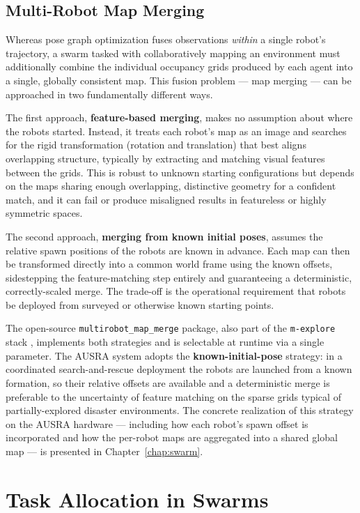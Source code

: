 \subsection{Multi-Robot Map Merging}
\label{subsec:map_merging}
Whereas pose graph optimization fuses observations \emph{within} a single robot's trajectory, a swarm tasked with collaboratively mapping an environment must additionally combine the individual occupancy grids produced by each agent into a single, globally consistent map. This fusion problem --- map merging --- can be approached in two fundamentally different ways.

The first approach, \textbf{feature-based merging}, makes no assumption about where the robots started. Instead, it treats each robot's map as an image and searches for the rigid transformation (rotation and translation) that best aligns overlapping structure, typically by extracting and matching visual features between the grids. This is robust to unknown starting configurations but depends on the maps sharing enough overlapping, distinctive geometry for a confident match, and it can fail or produce misaligned results in featureless or highly symmetric spaces.

The second approach, \textbf{merging from known initial poses}, assumes the relative spawn positions of the robots are known in advance. Each map can then be transformed directly into a common world frame using the known offsets, sidestepping the feature-matching step entirely and guaranteeing a deterministic, correctly-scaled merge. The trade-off is the operational requirement that robots be deployed from surveyed or otherwise known starting points.

The open-source \texttt{multirobot\_map\_merge} package, also part of the \texttt{m-explore} stack \cite{hornerexplore}, implements both strategies and is selectable at runtime via a single parameter. The AUSRA system adopts the \textbf{known-initial-pose} strategy: in a coordinated search-and-rescue deployment the robots are launched from a known formation, so their relative offsets are available and a deterministic merge is preferable to the uncertainty of feature matching on the sparse grids typical of partially-explored disaster environments. The concrete realization of this strategy on the AUSRA hardware --- including how each robot's spawn offset is incorporated and how the per-robot maps are aggregated into a shared global map --- is presented in Chapter~\ref{chap:swarm}.

\section{Task Allocation in Swarms}
\label{sec:task_allocation}


